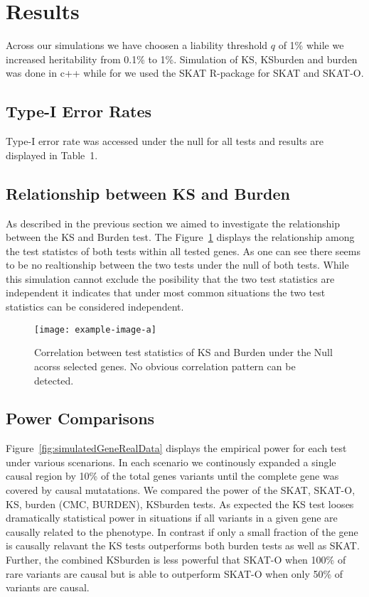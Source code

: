 \section{Results}
\label{sec:results}

Across our simulations we have choosen a liability threshold $q$ of 1\% while we increased heritability from 0.1\% to 1\%.
Simulation of KS, KSburden and burden was done in c++ while for we used the SKAT R-package for SKAT and SKAT-O. %

\subsection{Type-I Error Rates}
\label{sub:type_i_error_rates}

Type-I error rate was accessed under the null for all tests and results are displayed in Table~1. 

\subsection{Relationship between KS and Burden}
\label{sub:relationship_between_ks_and_burden}

As described in the previous section we aimed to investigate the relationship between the KS and Burden test.
The Figure~\ref{fig:correlation_ks_burden} displays the relationship among the test statistcs of both tests within all tested genes.
As one can see there seems to be no realtionship between the two tests under the null of both tests.
While this simulation cannot exclude the posibility that the two test statistics are independent it indicates that under most common situations the two test statistics can be considered independent.

\begin{figure}[ht!]
  \centering
  \texttt{[image: example-image-a]}
  \caption{Correlation between test statistics of KS and Burden under the Null acorss selected genes. No obvious correlation pattern can be detected.}\label{fig:correlation_ks_burden}
\end{figure}

\subsection{Power Comparisons}
\label{sub:power_comparisons}

Figure~\ref{fig:simulatedGeneRealData} displays the empirical power for each test under various scenarions.
In each scenario we continously expanded a single causal region by 10\% of the total genes variants until the complete gene was covered by causal mutatations.
We compared the power of the SKAT, SKAT-O, KS, burden (CMC, BURDEN), KSburden tests.
As expected the KS test looses dramatically statistical power in situations if all variants in a given gene are causally related to the phenotype.
In contrast if only a small fraction of the gene is causally relavant the KS tests outperforms both burden tests as well as SKAT\@.
Further, the combined KSburden is less powerful that SKAT-O when 100\% of rare variants are causal but is able to outperform SKAT-O when only 50\% of variants are causal.

